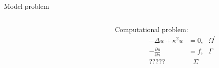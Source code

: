 \documentclass{beamer}
\begin{document}
\begin{frame}{Model problem}
  \begin{columns}
    \begin{column}{0.45\textwidth}
  \begin{figure}[ht]
    \begin{center}
    \end{center}
    \label{fig:pmldomain}
  \end{figure}
    \end{column}
    \begin{column}{0.55\textwidth}
      Computational problem:
      \[
      \begin{split}
        -\Delta u + \kappa^2 u & = 0,  \ \ \ \Omega^\prime \\
        -\frac{\partial u}{\partial n} & =  f, \ \ \ \Gamma \\
        ????? & \ \ \ \Sigma
      \end{split}
      \]
    \end{column}
\end{columns}
\end{frame}
\end{document}
